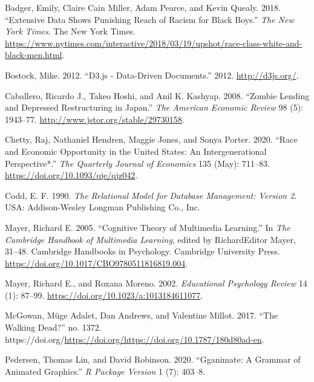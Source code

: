 \hypertarget{refs}{}
\begin{CSLReferences}{1}{0}
\leavevmode{}%
Badger, Emily, Claire Cain Miller, Adam Pearce, and Kevin Quealy. 2018. {``Extensive Data Shows Punishing Reach of Racism for Black Boys.''} \emph{The New York Times}. The New York Times. \url{https://www.nytimes.com/interactive/2018/03/19/upshot/race-class-white-and-black-men.html}.

\leavevmode{}%
Bostock, Mike. 2012. {``D3.js - Data-Driven Documents.''} 2012. \url{http://d3js.org/}.

\leavevmode{}%
Caballero, Ricardo J., Takeo Hoshi, and Anil K. Kashyap. 2008. {``Zombie Lending and Depressed Restructuring in Japan.''} \emph{The American Economic Review} 98 (5): 1943--77. \url{http://www.jstor.org/stable/29730158}.

\leavevmode{}%
Chetty, Raj, Nathaniel Hendren, Maggie Jones, and Sonya Porter. 2020. {``Race and Economic Opportunity in the United States: An Intergenerational Perspective*.''} \emph{The Quarterly Journal of Economics} 135 (May): 711--83. \url{https://doi.org/10.1093/qje/qjz042}.

\leavevmode{}%
Codd, E. F. 1990. \emph{The Relational Model for Database Management: Version 2}. USA: Addison-Wesley Longman Publishing Co., Inc.

\leavevmode{}%
Mayer, Richard E. 2005. {``Cognitive Theory of Multimedia Learning.''} In \emph{The Cambridge Handbook of Multimedia Learning}, edited by RichardEditor Mayer, 31--48. Cambridge Handbooks in Psychology. Cambridge University Press. \url{https://doi.org/10.1017/CBO9780511816819.004}.

\leavevmode{}%
Mayer, Richard E., and Roxana Moreno. 2002. \emph{Educational Psychology Review} 14 (1): 87--99. \url{https://doi.org/10.1023/a:1013184611077}.

\leavevmode{}%
McGowan, Müge Adalet, Dan Andrews, and Valentine Millot. 2017. {``The Walking Dead?''} no. 1372. https://doi.org/\url{https://doi.org/https://doi.org/10.1787/180d80ad-en}.

\leavevmode{}%
Pedersen, Thomas Lin, and David Robinson. 2020. {``Gganimate: A Grammar of Animated Graphics.''} \emph{R Package Version} 1 (7): 403--8.


\end{CSLReferences}
